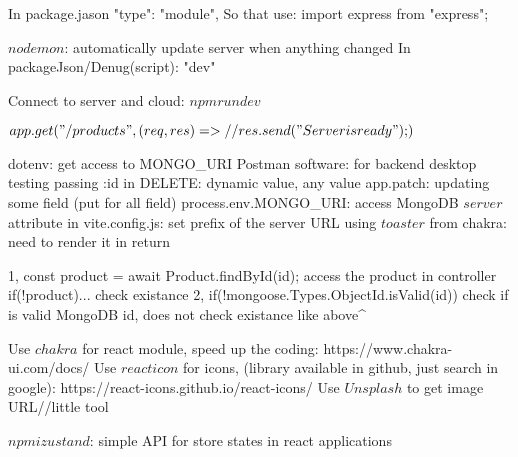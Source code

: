 In package.jason
    "type": "module",
    So that use: import express from "express";

    $nodemon$: automatically update server when anything changed
        In packageJson/Denug(script): "dev"

Connect to server and cloud: $  npm run dev  $

${
app.get("/products",(req,res) => {     %
    // res.send("Server is ready");
})
}$

dotenv:                                         get access to MONGO_URI
Postman software:                               for backend desktop testing
passing :id in DELETE:                          dynamic value, any value  
app.patch:                                      updating some field (put for all field)
process.env.MONGO_URI:                          access MongoDB
$server$ attribute in vite.config.js:           set prefix of the server URL
using $toaster$ from chakra:                    need to render it in return


1,  const product = await Product.findById(id);     access the product in controller
    if(!product)...                                 check existance
2,  if(!mongoose.Types.ObjectId.isValid(id))        check if is valid MongoDB id, does not check existance like above^

Use $chakra$ for react module, speed up the coding: https://www.chakra-ui.com/docs/
Use $react icon$ for icons, (library available in github, just search in google): https://react-icons.github.io/react-icons/
Use $Unsplash$ to get image URL//little tool

$npm i zustand$: simple API for store states in react applications

